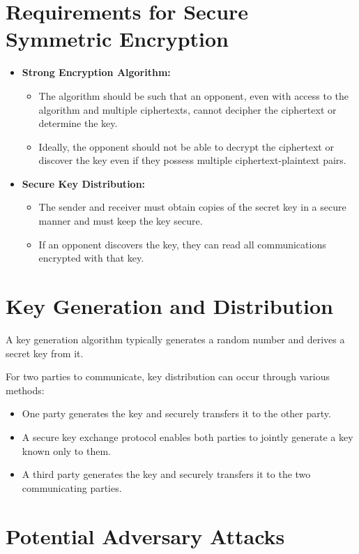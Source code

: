 \section{Requirements for Secure Symmetric Encryption}

\begin{itemize}
    \item \textbf{Strong Encryption Algorithm:} 
    \begin{itemize}
        \item The algorithm should be such that an opponent, even with access to the algorithm and multiple ciphertexts, cannot decipher the ciphertext or determine the key.
        \item Ideally, the opponent should not be able to decrypt the ciphertext or discover the key even if they possess multiple ciphertext-plaintext pairs.
    \end{itemize}
    \item \textbf{Secure Key Distribution:} 
    \begin{itemize}
        \item The sender and receiver must obtain copies of the secret key in a secure manner and must keep the key secure.
        \item If an opponent discovers the key, they can read all communications encrypted with that key.
    \end{itemize}
\end{itemize}


\section{Key Generation and Distribution}

A key generation algorithm typically generates a random number and derives a secret key from it.

For two parties to communicate, key distribution can occur through various methods:
\begin{itemize}
    \item One party generates the key and securely transfers it to the other party.
    \item A secure key exchange protocol enables both parties to jointly generate a key known only to them.
    \item A third party generates the key and securely transfers it to the two communicating parties.
\end{itemize}

\section{Potential Adversary Attacks}

